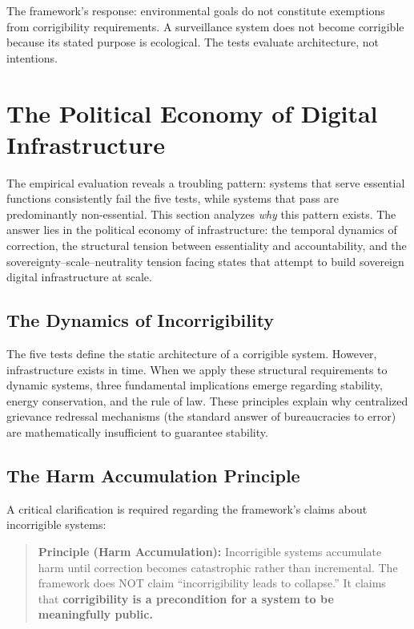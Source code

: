 \documentclass{article}
\begin{document}
The framework's response: environmental goals do not constitute exemptions from corrigibility requirements. A surveillance system does not become corrigible because its stated purpose is ecological. The tests evaluate architecture, not intentions.


\section{The Political Economy of Digital Infrastructure}
\label{sec:political-economy}

The empirical evaluation reveals a troubling pattern: systems that serve essential functions consistently fail the five tests, while systems that pass are predominantly non-essential. This section analyzes \textit{why} this pattern exists. The answer lies in the political economy of infrastructure: the temporal dynamics of correction, the structural tension between essentiality and accountability, and the sovereignty--scale--neutrality tension facing states that attempt to build sovereign digital infrastructure at scale.

\subsection{The Dynamics of Incorrigibility}
\label{sec:dynamics}

The five tests define the static architecture of a corrigible system. However, infrastructure exists in time. When we apply these structural requirements to dynamic systems, three fundamental implications emerge regarding stability, energy conservation, and the rule of law. These principles explain why centralized grievance redressal mechanisms (the standard answer of bureaucracies to error) are mathematically insufficient to guarantee stability.

\subsection{The Harm Accumulation Principle}

A critical clarification is required regarding the framework's claims about incorrigible systems:

\begin{quote}
\textbf{Principle (Harm Accumulation):} Incorrigible systems accumulate harm until correction becomes catastrophic rather than incremental. The framework does NOT claim ``incorrigibility leads to collapse.'' It claims that \textbf{corrigibility is a precondition for a system to be meaningfully public.}
\end{quote}
\end{document}

